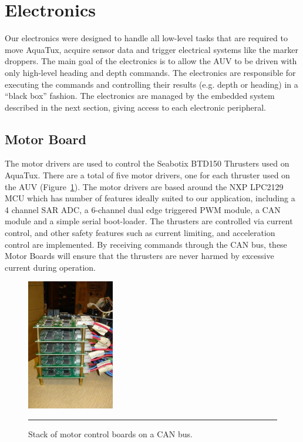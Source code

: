
\section{Electronics}
Our electronics were designed to handle all low-level tasks that are
required to move AquaTux, acquire sensor data and trigger
electrical systems like the  marker droppers. The main goal
of the electronics is to allow the AUV to be driven with only
high-level heading and depth commands. The electronics are responsible for
executing the commands and controlling their results (e.g. depth or
heading) in a ``black box'' fashion. The electronics are managed by the embedded
system described in the next section, giving access to each electronic peripheral.

\subsection{Motor Board}

The motor drivers are used to control the Seabotix BTD150 Thrusters
used on AquaTux.  There are a total of five motor drivers, one for
each thruster used on the AUV (Figure~\ref{mstack}). The motor drivers are based around the NXP
LPC2129 MCU which has number of features ideally suited to our
application, including a 4 channel SAR ADC, a 6-channel dual edge
triggered PWM module, a CAN module and a simple serial boot-loader.
The thrusters are controlled via current control, and other safety
features such as current limiting, and acceleration control are
implemented.  By receiving commands through the CAN bus, these Motor
Boards will ensure that the thrusters are never harmed by excessive
current during operation.

\begin{figure}
\begin{center}
 \includegraphics[width=1.5in]{fig/dsc06472} %
\vspace{.05in}
\hrule
\caption{Stack of motor control boards on a CAN bus.}\label{mstack}
\end{center}
\end{figure}


